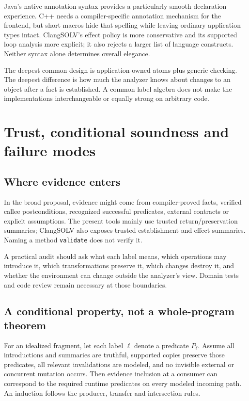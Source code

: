 \documentclass[11pt]{article}
\begin{document}
Java's native annotation syntax provides a particularly smooth declaration
experience. C++ needs a compiler-specific annotation mechanism for the
frontend, but short macros hide that spelling while leaving ordinary
application types intact. ClangSOLV's effect policy is more conservative
and its supported loop analysis more explicit; it also rejects a larger
list of language constructs. Neither syntax alone determines overall elegance.

The deepest common design is application-owned atoms plus generic checking.
The deepest difference is how much the analyzer knows about changes to an
object after a fact is established. A common label algebra does not make the
implementations interchangeable or equally strong on arbitrary code.

\section{Trust, conditional soundness and failure modes}
\subsection{Where evidence enters}
In the broad proposal, evidence might come from compiler-proved facts,
verified callee postconditions, recognized successful predicates, external
contracts or explicit assumptions. The present tools mainly use trusted
return/preservation summaries; ClangSOLV also exposes trusted establishment
and effect summaries. Naming a method \texttt{validate} does not verify it.

A practical audit should ask what each label means, which operations may
introduce it, which transformations preserve it, which changes destroy it,
and whether the environment can change outside the analyzer's view. Domain
tests and code review remain necessary at those boundaries.

\subsection{A conditional property, not a whole-program theorem}
For an idealized fragment, let each label $\ell$ denote a predicate $P_\ell$.
Assume all introductions and summaries are truthful, supported copies preserve
those predicates, all relevant invalidations are modeled, and no invisible
external or concurrent mutation occurs. Then evidence inclusion at a consumer
can correspond to the required runtime predicates on every modeled incoming
path. An induction follows the producer, transfer and intersection rules.
\end{document}
